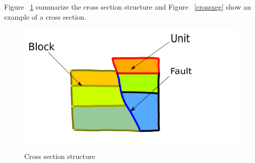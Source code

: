 \documentclass[12pt, a4paper]{report} %
\begin{document}
Figure ~\ref{geostruct} summarize the cross section structure and Figure ~\ref{crossxeg} show an example of a cross section.
 \begin{figure}[H]
	\centering
	\includegraphics[scale=0.3]{geologyStructEdit.png}
	\caption{Cross section structure}
	\label{geostruct}
\end{figure}
\end{document}
